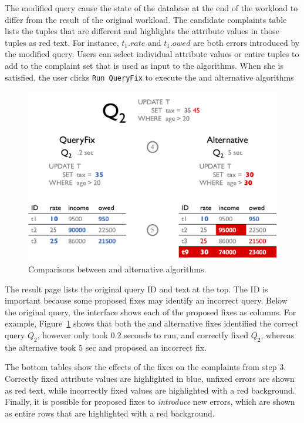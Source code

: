 The modified query cause the state of the database at the end of the workload
to differ from the result of the original workload.  The candidate complaints table lists the tuples
that are different and highlights the attribute values in those tuples as red text.  For instance,
$t_1.rate$ and $t_1.owed$ are both errors introduced by the modified query.  Users can select individual
attribute values or entire tuples to add to the complaint set that is used as input to the \sys algorithms.  
When she is satisfied, the user clicks \texttt{Run QueryFix} to execute the \sys and alternative algorithms


\begin{figure}[h]
\centering
  \includegraphics[width = .85\columnwidth]{figures/demo2}
  \caption{Comparisons between \sys and alternative algorithms.}
  \label{f:demo2} 
\end{figure}

  The result page lists the original query ID and text at the top.  The ID 
is important because some proposed fixes may identify an incorrect query.  Below the original query,
the interface shows each of the proposed fixes as columns.  For example, Figure~\ref{f:demo2} shows 
that both the \sys and alternative fixes identified the correct query $Q_2$, however \sys only took $0.2$ seconds
to run, and correctly fixed $Q_2$, whereas the alternative took $5$ sec and proposed an incorrect fix.

 The bottom tables show the effects of the fixes on the complaints from
step 3.  Correctly fixed attribute values are highlighted in blue, unfixed errors are shown as red text, while incorrectly
fixed values are highlighted with a red background.  Finally, it is possible for proposed fixes to 
{\it introduce} new errors, which are shown as entire rows that are highlighted with a red background.








